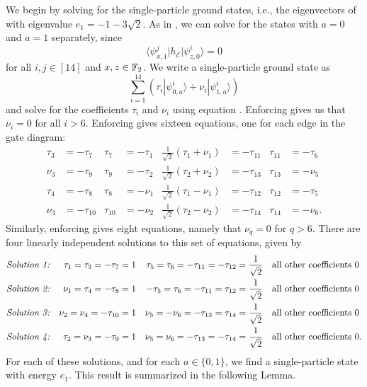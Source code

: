 \documentclass[../thesis-main/thesis-main]{subfiles}
\begin{document}
We begin by solving for the single-particle ground states, i.e., the eigenvectors of  with eigenvalue $e_{1}=-1-3\sqrt{2}$. As in , we can solve for the states with $a=0$ and $a=1$ separately, since
\begin{equation}
  \langle\psi_{x,1}^{j}|h_{\mathcal{E}}|\psi_{z,0}^{i}\rangle=0
\end{equation}
for all $i,j\in[14]$ and $x,z\in \mathbb{F}_2$. We write a single-particle ground state as
\begin{equation}
  \sum_{i=1}^{14}\left(\tau_{i}|\psi_{0,a}^{i}\rangle+\nu_{i}|\psi_{1,a}^{i}\rangle\right)
\end{equation}
and solve for the coefficients $\tau_{i}$ and $\nu_{i}$ using equation .  Enforcing  gives us that $\nu_i = 0$ for all $i>6$. Enforcing  gives sixteen equations, one for each edge in the gate diagram:
\begin{align}
  \tau_{3}&=-\tau_{7} & 
  \tau_{7}&= - \tau_{1}&
  \frac{1}{\sqrt{2}}(\tau_{1}+\nu_{1})&=-\tau_{11}&
  \tau_{11} &= -\tau_{6} \\
  \nu_{3} &= -\tau_{9}&
  \tau_{9} &= -\tau_{2} &
  \frac{1}{\sqrt{2}}(\tau_{2}+\nu_{2})&=-\tau_{13}&
  \tau_{13} &= - \nu_{5}\\
  \tau_{4}&=-\tau_{8} & 
  \tau_{8}&=-\nu_{1} &
  \frac{1}{\sqrt{2}}(\tau_{1}-\nu_{1})&=-\tau_{12} &
  \tau_{12} &= - \tau_{5}\\
  \nu_{3}&=-\tau_{10} & 
  \tau_{10} &= - \nu_{2} &
  \frac{1}{\sqrt{2}}(\tau_{2}-\nu_{2})&=-\tau_{14}&
  \tau_{14} &= - \nu_{6}  .
\end{align}
Similarly, enforcing  gives eight equations, namely that $\nu_q = 0$ for $q>6$.  There are four linearly independent solutions to this set of equations, given by 
\begin{align}
  \text{\emph{Solution 1:}} && 
    \tau_{1} = \tau_{3} = -\tau_{7} &=1 & 
    \tau_{5} =  \tau_{6} = -\tau_{11} = - \tau_{12} &=\frac{1}{\sqrt{2}} &&
    \text{all other coefficients }0 \\
  \text{\emph{Solution 2:}} && 
    \nu_{1} = \tau_{4} = -\tau_{8} &=1 &
    -\tau_{5} =  \tau_{6} = -\tau_{11} = \tau_{12} &= \frac{1}{\sqrt{2}} &&
    \text{all other coefficients }0 \\
  \text{\emph{Solution 3:}} && 
    \nu_{2} = \nu_{4} = -\tau_{10} &= 1 &
    \nu_{5} = -\nu_{6} = -\tau_{13} = \tau_{14} &= \frac{1}{\sqrt{2}} &&
    \text{all other coefficients }0 \\
  \text{\emph{Solution 4:}} && 
    \tau_{2} =  \nu_{3} = -\tau_{9} &= 1 &
    \nu_{5} =  \nu_{6} = -\tau_{13} = -\tau_{14} &=\frac{1}{\sqrt{2}} &&
    \text{all other coefficients }0.
\end{align}
For each of these solutions, and for each $a\in\{0,1\}$, we find a single-particle state with energy $e_1$. This result is summarized in the following Lemma.
\end{document}
